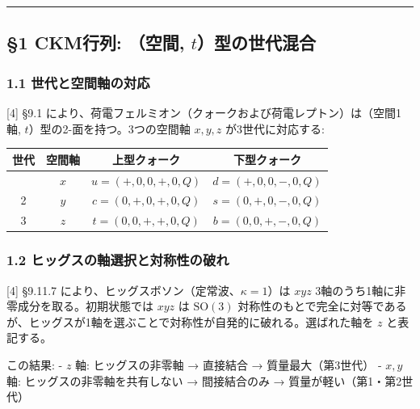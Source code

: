 \documentclass[
  a4paper,11pt]{ltjsarticle}
\newcounter{none} %
\begin{document}
\begin{center}\rule{0.5\linewidth}{0.5pt}\end{center}

\subsection{\texorpdfstring{§1 CKM行列: （空間,
\(t\)）型の世代混合}{§1 CKM行列: （空間, t）型の世代混合}}\label{ckmux884cux5217-ux7a7aux9593-tux578bux306eux4e16ux4ee3ux6df7ux5408}

\subsubsection{1.1
世代と空間軸の対応}\label{ux4e16ux4ee3ux3068ux7a7aux9593ux8ef8ux306eux5bfeux5fdc}

{[}4{]} §9.1
により、荷電フェルミオン（クォークおよび荷電レプトン）は（空間1軸,
\(t\)）型の2-面を持つ。3つの空間軸 \(x, y, z\) が3世代に対応する:

{\def\LTcaptype{none} %
\begin{longtable}[]{@{}cccc@{}}
\toprule\noalign{}
世代 & 空間軸 & 上型クォーク & 下型クォーク \\
\midrule\noalign{}
\endhead
\bottomrule\noalign{}
\endlastfoot
1 & \(x\) & \(u = (+, 0, 0, +, 0, Q)\) & \(d = (+, 0, 0, -, 0, Q)\) \\
2 & \(y\) & \(c = (0, +, 0, +, 0, Q)\) & \(s = (0, +, 0, -, 0, Q)\) \\
3 & \(z\) & \(t = (0, 0, +, +, 0, Q)\) & \(b = (0, 0, +, -, 0, Q)\) \\
\end{longtable}
}

\subsubsection{1.2
ヒッグスの軸選択と対称性の破れ}\label{ux30d2ux30c3ux30b0ux30b9ux306eux8ef8ux9078ux629eux3068ux5bfeux79f0ux6027ux306eux7834ux308c}

{[}4{]} §9.11.7 により、ヒッグスボソン（定常波、\(\kappa = 1\)）は
\(xyz\) 3軸のうち1軸に非零成分を取る。初期状態では \(xyz\) は
\(\mathrm{SO}(3)\)
対称性のもとで完全に対等であるが、ヒッグスが1軸を選ぶことで対称性が自発的に破れる。選ばれた軸を
\(z\) と表記する。

この結果: - \(z\) 軸: ヒッグスの非零軸 → 直接結合 → 質量最大（第3世代）
- \(x, y\) 軸: ヒッグスの非零軸を共有しない → 間接結合のみ →
質量が軽い（第1・第2世代）
\end{document}

